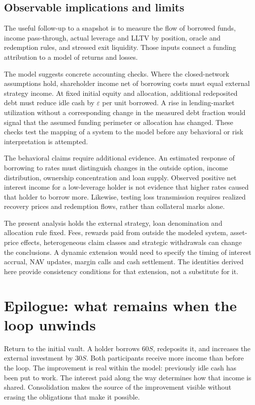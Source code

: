 \documentclass[12pt,oneside]{article}
\begin{document}
\subsection{Observable implications and limits}
The useful follow-up to a snapshot is to measure the flow of borrowed
funds, income pass-through, actual leverage and LLTV by position,
oracle and redemption rules, and stressed exit liquidity. Those inputs
connect a funding attribution to a model of returns and losses.

The model suggests concrete accounting checks. Where the closed-network
assumptions hold, shareholder income net of borrowing costs must equal
external strategy income. At fixed initial equity and allocation, additional redeposited
debt must reduce idle cash by $\varepsilon$ per unit borrowed. A rise
in lending-market utilization without a corresponding change in the
measured debt fraction would signal that the assumed funding perimeter
or allocation has changed. These checks test the mapping of a system
to the model before any behavioral or risk interpretation is attempted.

The behavioral claims require additional evidence. An estimated response
of borrowing to rates must distinguish changes in the outside option,
income distribution, ownership concentration and loan supply. Observed
positive net interest income for a low-leverage holder is not evidence
that higher rates caused that holder to borrow more. Likewise, testing
loss transmission requires realized recovery prices and redemption
flows, rather than collateral marks alone.

The present analysis holds the external strategy, loan denomination and
allocation rule fixed. Fees, rewards paid from outside the modeled
system, asset-price effects, heterogeneous claim classes and strategic
withdrawals can change the conclusions. A dynamic extension would need
to specify the timing of interest accrual, NAV updates, margin calls and
cash settlement. The identities derived here provide consistency
conditions for that extension, not a substitute for it.

\section{Epilogue: what remains when the loop unwinds}
\label{sec:epilogue}
Return to the initial vault. A holder borrows $60S$, redeposits it,
and increases the external investment by $30S$. Both participants
receive more income than before the loop. The improvement is real
within the model: previously idle cash has been put to work. The
interest paid along the way determines how that income is shared.
Consolidation makes the source of the improvement visible without
erasing the obligations that make it possible.
\end{document}
